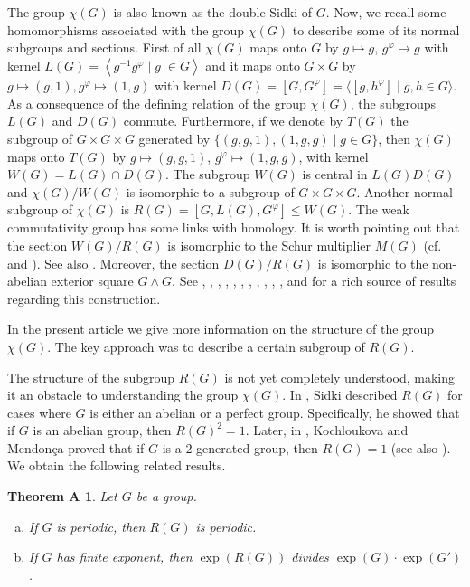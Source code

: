 \documentclass[12pt,leqno]{amsart}
\newtheorem*{thmA}{Theorem A}
\begin{document}
The group $\chi(G)$ is also known as the double Sidki of $G$. Now, we recall some homomorphisms associated with the group $\chi (G)$ to describe some of its normal subgroups and sections. First of all $\chi(G)$ maps onto $G$ by $g\mapsto g$, $g^{\varphi }\mapsto g$
with kernel $L(G)=\left\langle g^{-1}g^{\varphi } \mid g\;\in G\right\rangle $ and it
maps onto $G\times G$ by $g\mapsto \left( g,1\right) ,g^{\varphi
}\mapsto \left( 1,g\right) $ with kernel $D(G)= [G,G^{\varphi}] = \langle [g,h^{\varphi}] \mid g,h \in G \rangle$. As a consequence of the defining relation of the group $\chi(G)$, the subgroups $L(G)$ and $D(G)$ commute. Furthermore, if we denote by $T(G)$ the
subgroup of $G\times G\times G$ generated by $\{(g,g,1),(1,g,g)\mid g\in G\}$, then $\chi (G)$ maps onto $T(G)$ by $g\mapsto \left( g,g,1\right)$, $g^{\varphi }\mapsto \left( 1,g,g\right) $, with kernel $W(G)=L(G)\cap D(G)$. The subgroup $W(G)$ is central in $ L(G)D(G)$ and $\chi(G)/W(G)$ is isomorphic to a subgroup of $G \times G \times G$. Another normal subgroup of $\chi (G)$ is $R(G)=
[G,L(G),G^{\varphi}] \leq W(G)$. The weak commutativity group has some links with homology. It is worth pointing out that the section $W(G)/R(G)$ is isomorphic to the Schur multiplier $M(G)$ (cf. \cite[Lemma 4.1.11]{Sidki} and \cite[Lemma 2.2]{Roc82}). See also \cite{Miller}. Moreover, the section $D(G)/R(G)$ is isomorphic to the non-abelian exterior square $G \wedge G$. See \cite{BdMdO}, \cite{BdMGN}, \cite{BdOLN}, \cite{BK}, \cite{BK1}, \cite{DK}, \cite{GRS}, \cite{KM}, \cite{KS}, \cite{LO}, \cite{Mend}, \cite{Roc82} and \cite{Sidki} for a  rich source  of results  regarding this construction. 

In the present article we give more information on the structure of the group $\chi(G)$. The key approach was to describe a certain subgroup of $R(G)$.

The structure of the subgroup $R(G)$ is not yet completely understood, making it an obstacle to understanding the group $\chi(G)$. In \cite{Sidki}, Sidki described $R(G)$ for cases where $G$ is either an abelian or a perfect group. Specifically, he showed that if $G$ is an abelian group, then $R(G)^2=1$. Later, in \cite{KM}, Kochloukova and Mendon\c ca proved that if $G$ is a $2$-generated group, then $R(G)=1$ (see also \cite[Remark 3.2~(ii)]{BdOLN}). We obtain the following related results. 

\begin{thmA} \label{thm:R}
Let $G$ be a group. 
\begin{enumerate}[(a)]
    \item If $G$ is periodic, then $R(G)$ is periodic.
    \item If $G$ has finite exponent, then $\exp(R(G))$ divides $\exp(G) \cdot \exp(G')$.
\end{enumerate}
\end{thmA}
\end{document}
